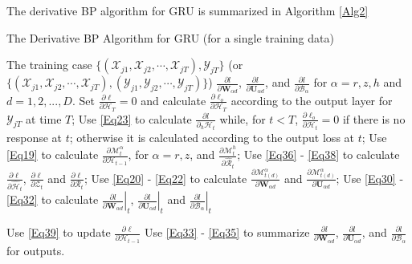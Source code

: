 \documentclass[journal]{IEEEtran}
\renewcommand{\algorithmicrequire}{\textbf{Input:}}
\renewcommand{\algorithmicensure}{\textbf{Output:}}
\begin{document}
The derivative BP algorithm for GRU is summarized in Algorithm \ref{Alg2}
\begin{algorithm}
\renewcommand{\algorithmicrequire}{\textbf{Input:}}
\renewcommand\algorithmicensure {\textbf{Output:} } 
\caption{The Derivative BP Algorithm for GRU (for a single training data)} \label{Alg2}
\begin{algorithmic}[1]
  \REQUIRE The training case $\{(\mathcal{X}_{j1}, \mathcal{X}_{j2}, \cdots, \mathcal{X}_{jT}), \mathcal{Y}_{jT}\}$ (or $\{(\mathcal{X}_{j1}, \mathcal{X}_{j2}, \cdots, \mathcal{X}_{jT}), (\mathcal{Y}_{j1}, \mathcal{Y}_{j2}, \cdots, \mathcal{Y}_{jT})\}$)  
  \ENSURE $\frac{\partial l}{\partial \mathbf W_{\alpha d}}$, $\frac{\partial l}{\partial \mathbf U_{\alpha d}}$, and $\frac{\partial l}{\partial \mathcal{B}_{\alpha}}$ for $\alpha = r, z, h$ and $d=1, 2, ..., D$.
\STATE Set $\frac{\partial \ell}{\partial \mathcal{H}_T}=0$ and calculate  $\frac{\partial \ell_o}{\partial \mathcal{H}_T}$ according to the output layer for $\mathcal{Y}_{jT}$ at time $T$; 
 \STATE Use \eqref{Eq23} to calculate $\frac{\partial l}{\partial_h\mathcal{H}_t}$ while, for $t<T$, $\frac{\partial \ell_o}{\partial \mathcal{H}_t} = 0$ if there is no response at $t$; otherwise it is calculated according to the output loss at $t$;
 \STATE Use \eqref{Eq19} to calculate  $\frac{\partial \mathcal{M}^{\alpha}_t}{\partial \mathcal{H}_{t-1}}$, for $\alpha = r, z$, and $\frac{\partial \mathcal{M}^{h}_t}{\partial \widehat{\mathcal{R}}_{t}}$;  
    \STATE Use \eqref{Eq36} - \eqref{Eq38} to calculate  $\frac{\partial \ell}{\partial \widehat{\mathcal{H}}_{t}}$,  $\frac{\partial \ell}{\partial {\mathcal{Z}}_{t}}$ and $\frac{\partial \ell}{\partial \mathcal{R}_{t}}$;
\STATE Use \eqref{Eq20} - \eqref{Eq22} to calculate $\frac{\partial \mathcal{M}^{\alpha}_{t(d)}}{\partial \mathbf W_{\alpha d}}$ and $\frac{\partial \mathcal{M}^{\alpha}_{t(d)}}{\partial \mathbf U_{\alpha d}}$;   
\STATE Use \eqref{Eq30} - \eqref{Eq32} to calculate $\left.\frac{\partial l}{\partial \mathbf W_{\alpha d}}\right|_{t}$, $\left.\frac{\partial l}{\partial \mathbf U_{\alpha d}}\right|_{t}$ and $\left.\frac{\partial l}{\partial \mathcal{B}_{\alpha }}\right|_{t}$

\STATE Use  \eqref{Eq39} to update $\frac{\partial \ell}{\partial \mathcal{H}_{t-1}}$
 \ENDFOR
\STATE Use \eqref{Eq33} - \eqref{Eq35} to summarize $\frac{\partial l}{\partial \mathbf W_{\alpha d}}$, $\frac{\partial l}{\partial \mathbf U_{\alpha d}}$, and $\frac{\partial l}{\partial \mathcal{B}_{\alpha}}$ for outputs.
\end{algorithmic}
\end{algorithm}
\end{document}
